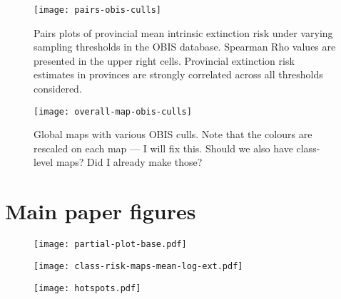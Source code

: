 \documentclass[11pt]{article}
\begin{document}
\clearpage

\begin{figure}[htbp]
\begin{center}
\texttt{[image: pairs-obis-culls]}
\caption{Pairs plots of provincial mean intrinsic extinction risk under varying sampling thresholds in the OBIS database. Spearman Rho values are presented in the upper right cells. Provincial extinction risk estimates in provinces are strongly correlated across all thresholds considered.}
\label{fig:pairs-prov-obis-culls}
\end{center}
\end{figure}

\clearpage

\begin{figure}[htbp]
\begin{center}
\texttt{[image: overall-map-obis-culls]}
\caption{Global maps with various OBIS culls. Note that the colours are rescaled on each map --- I will fix this. Should we also have class-level maps? Did I already make those?}
\label{fig:overall-maps-obis-culls}
\end{center}
\end{figure}

\section{Main paper figures}

\begin{figure}[htbp]
\begin{center}
\texttt{[image: partial-plot-base.pdf]}
\caption{}
\label{fig:1}
\end{center}
\end{figure}

\begin{figure}[htbp]
\begin{center}
\texttt{[image: class-risk-maps-mean-log-ext.pdf]}
\caption{}
\label{fig:2}
\end{center}
\end{figure}

\begin{figure}[htbp]
\begin{center}
\texttt{[image: hotspots.pdf]}
\caption{}
\label{fig:3}
\end{center}
\end{figure}
\end{document}
